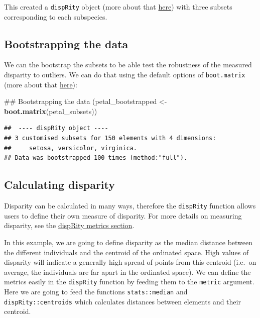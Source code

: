 \documentclass[]{book}
\newenvironment{Shaded}{\begin{snugshade}}{\end{snugshade}}
\newcommand{\KeywordTok}[1]{\textcolor[rgb]{0.13,0.29,0.53}{\textbf{#1}}}
\newcommand{\StringTok}[1]{\textcolor[rgb]{0.31,0.60,0.02}{#1}}
\newcommand{\NormalTok}[1]{#1}
\theoremstyle{definition}
\theoremstyle{definition}
\theoremstyle{remark}
\begin{document}
This created a \texttt{dispRity} object (more about that
\protect\hyperlink{guts}{here}) with three subsets corresponding to each
subspecies.

\subsection{Bootstrapping the data}\label{bootstrapping-the-data-1}

We can the bootstrap the subsets to be able test the robustness of the
measured disparity to outliers. We can do that using the default options
of \texttt{boot.matrix} (more about that
\protect\hyperlink{bootstraps-and-rarefactions}{here}):

\begin{Shaded}
\begin{Highlighting}[]
\NormalTok{## Bootstrapping the data}
\NormalTok{(petal_bootstrapped <-}\StringTok{ }\KeywordTok{boot.matrix}\NormalTok{(petal_subsets))}
\end{Highlighting}
\end{Shaded}

\begin{verbatim}
##  ---- dispRity object ---- 
## 3 customised subsets for 150 elements with 4 dimensions:
##     setosa, versicolor, virginica.
## Data was bootstrapped 100 times (method:"full").
\end{verbatim}

\subsection{Calculating disparity}\label{calculating-disparity-1}

Disparity can be calculated in many ways, therefore the
\texttt{dispRity} function allows users to define their own measure of
disparity. For more details on measuring disparity, see the
\protect\hyperlink{disparity-metrics}{dispRity metrics section}.

In this example, we are going to define disparity as the median distance
between the different individuals and the centroid of the ordinated
space. High values of disparity will indicate a generally high spread of
points from this centroid (i.e.~on average, the individuals are far
apart in the ordinated space). We can define the metrics easily in the
\texttt{dispRity} function by feeding them to the \texttt{metric}
argument. Here we are going to feed the functions \texttt{stats::median}
and \texttt{dispRity::centroids} which calculates distances between
elements and their centroid.
\end{document}
